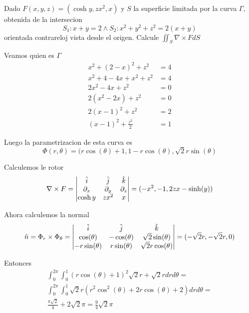 \message{ !name(MAT024.tex)}\documentclass[../main.tex]{subfiles}
\begin{document}
\begin{problem}
  Dado $F(x, y, z) = (\cosh y, zx^{2}, x)$ y $S$ la superficie limitada por la curva $\Gamma$, obtenida de la intersecion
  \begin{equation*}
    S_{1}: x + y = 2 \land S_{2}: x^{2} + y^{2} + z^{2} = 2(x + y)
  \end{equation*}
  orientada contrareloj vista desde el origen. Calcule $\iint_{S} \nabla \times F dS$
\end{problem}
\begin{solution}
  Veamos quien es $\Gamma$
  \begin{align*}
    x^{2} + (2 - x)^{2} + z^{2} &= 4\\
    x^{2} + 4 - 4x + x^{2} + z^{2} &= 4\\
    2x^{2} - 4x + z^{2} &= 0\\
    2(x^{2} - 2x) + z^{2} &= 0\\
    2(x - 1)^{2} + z^{2} &= 2\\
    (x - 1)^{2} + \frac{z^{2}}{2} &= 1
  \end{align*}

  Luego la parametrizacion de esta curva es
  \begin{equation*}
    \Phi(r, \theta) = (r \cos(\theta) + 1, 1 - r \cos(\theta), \sqrt{2}r \sin(\theta)
  \end{equation*}

  Calculemos le rotor
  \begin{equation*}
    \nabla \times F = \begin{vmatrix} \hat{i} & \hat{j} & \hat{k}\\ \partial_x & \partial_y & \partial_z\\ \cosh y & zx^{2} & x\end{vmatrix} = (-x^{2}, -1, 2zx - \sinh(y))
  \end{equation*}

  Ahora calculemos la normal
  \begin{equation*}
    \hat{n} = \Phi_{r} \times \Phi_{\theta} = \begin{vmatrix} \hat{i} & \hat{j} & \hat{k}\\ \cos(\theta) & -\cos(\theta) & \sqrt{2}\sin(\theta)\\ -r \sin(\theta) & r \sin(\theta) & \sqrt{2}r \cos(\theta)\end{vmatrix} = (-\sqrt{2} r, -\sqrt{2} r, 0)
  \end{equation*}

  Entonces
  \begin{gather*}
    \int_{0}^{2\pi}\int_{0}^{1} (r \cos(\theta) + 1)^{2}\sqrt{2}r + \sqrt{2}r dr d\theta =\\
    \int_{0}^{2\pi}\int_{0}^{1} \sqrt{2}r (r^{2} \cos^{2}(\theta) + 2r \cos(\theta) + 2) dr d \theta =\\
    \frac{\pi \sqrt{2}}{4} + 2\sqrt{2} \pi = \frac{9}{4} \sqrt{2} \pi
  \end{gather*}

\end{solution}
\end{document}
